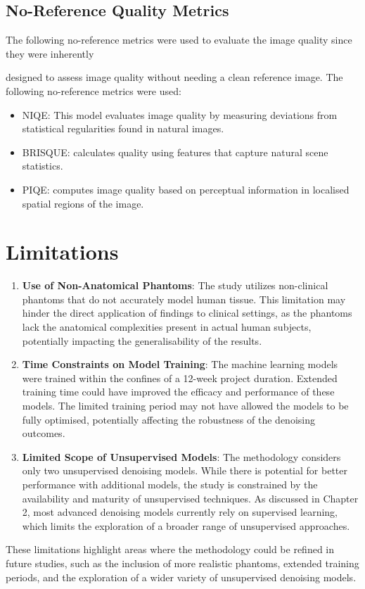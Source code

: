 \subsection{No-Reference Quality Metrics}
The following no-reference metrics were used to evaluate the image quality since they were inherently

designed to assess image quality without needing a clean reference image. The following no-reference metrics were used:

\begin{itemize}
	\item \gls{NIQE}: This model evaluates image quality by measuring deviations from statistical regularities found in natural images.
	\item \gls{BRISQUE}: calculates quality using features that capture natural scene statistics.
	\item \gls{PIQE}: computes image quality based on perceptual information in localised spatial regions of the image.
\end{itemize}

\section{Limitations}
\begin{enumerate}
	\item \textbf{Use of Non-Anatomical Phantoms}: The study utilizes non-clinical phantoms that do not accurately model human tissue. This limitation may hinder the direct application of findings to clinical settings, as the phantoms lack the anatomical complexities present in actual human subjects, potentially impacting the generalisability of the results.
	\item \textbf{Time Constraints on Model Training}: The machine learning models were trained within the confines of a 12-week project duration. Extended training time could have improved the efficacy and performance of these models. The limited training period may not have allowed the models to be fully optimised, potentially affecting the robustness of the denoising outcomes.
	\item \textbf{Limited Scope of Unsupervised Models}: The methodology considers only two unsupervised denoising models. While there is potential for better performance with additional models, the study is constrained by the availability and maturity of unsupervised techniques. As discussed in Chapter 2, most advanced denoising models currently rely on supervised learning, which limits the exploration of a broader range of unsupervised approaches.
\end{enumerate}
These limitations highlight areas where the methodology could be refined in future studies, such as the inclusion of more realistic phantoms, extended training periods, and the exploration of a wider variety of unsupervised denoising models.


